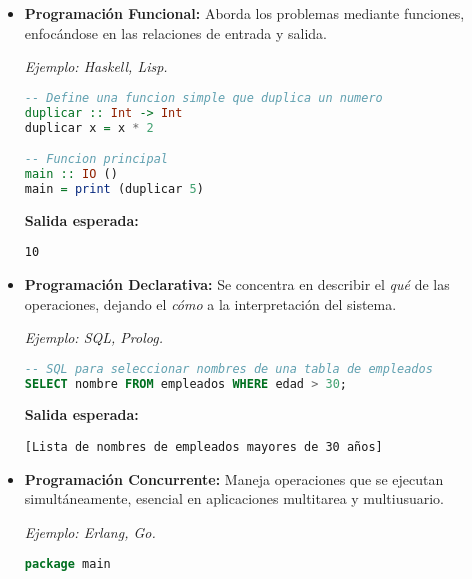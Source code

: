\documentclass{report}
\begin{document}
\begin{itemize}
\item \textbf{Programación Funcional:} Aborda los problemas mediante funciones, enfocándose en las relaciones de entrada y salida. 

\textit{Ejemplo: Haskell, Lisp.}

\begin{minipage}{\linewidth} %
\begin{lstlisting}[language=Haskell, caption=Ejemplo de Programacion Funcional en Haskell]
-- Define una funcion simple que duplica un numero
duplicar :: Int -> Int
duplicar x = x * 2

-- Funcion principal
main :: IO ()
main = print (duplicar 5)
\end{lstlisting}

\textbf{Salida esperada:}
\begin{verbatim}
10
\end{verbatim}
\end{minipage} %

\item \textbf{Programación Declarativa:} Se concentra en describir el \textit{qué} de las operaciones, dejando el \textit{cómo} a la interpretación del sistema. 

\textit{Ejemplo: SQL, Prolog.}

\begin{minipage}{\linewidth} %
\begin{lstlisting}[language=SQL, caption=Ejemplo de Programacion Declarativa en SQL]
-- SQL para seleccionar nombres de una tabla de empleados
SELECT nombre FROM empleados WHERE edad > 30;
\end{lstlisting}

\textbf{Salida esperada:}
\begin{verbatim}
[Lista de nombres de empleados mayores de 30 años]
\end{verbatim}
\end{minipage} %

\item \textbf{Programación Concurrente:} Maneja operaciones que se ejecutan simultáneamente, esencial en aplicaciones multitarea y multiusuario. 

\textit{Ejemplo: Erlang, Go.}

\begin{minipage}{\linewidth} %
\begin{lstlisting}[language=Go, caption=Ejemplo de Programacion Concurrente en Go]
package main


\end{lstlisting}
\end{minipage}
\end{itemize}
\end{document}
